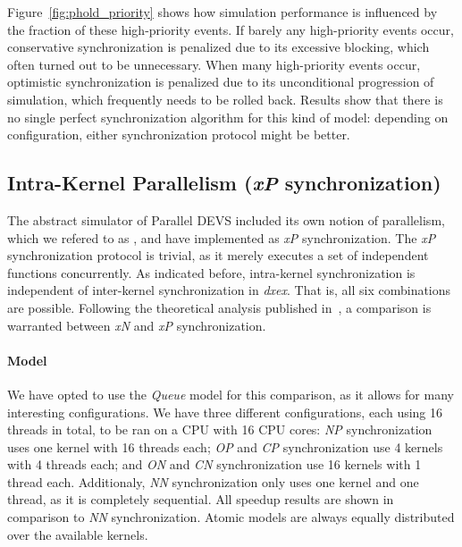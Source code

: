 Figure~\ref{fig:phold_priority} shows how simulation performance is influenced by the fraction of these high-priority events.
If barely any high-priority events occur, conservative synchronization is penalized due to its excessive blocking, which often turned out to be unnecessary.
When many high-priority events occur, optimistic synchronization is penalized due to its unconditional progression of simulation, which frequently needs to be rolled back.
Results show that there is no single perfect synchronization algorithm for this kind of model: depending on configuration, either synchronization protocol might be better.

\subsection{Intra-Kernel Parallelism (\textit{xP} synchronization)}
The abstract simulator of \textsf{Parallel DEVS} included its own notion of parallelism, which we refered to as \pSim, and have implemented as \textit{xP} synchronization.
The \textit{xP} synchronization protocol is trivial, as it merely executes a set of independent functions concurrently.
As indicated before, intra-kernel synchronization is independent of inter-kernel synchronization in \textit{dxex}.
That is, all six combinations are possible.
Following the theoretical analysis published in~\cite{amdahlpdevs}, a comparison is warranted between \textit{xN} and \textit{xP} synchronization.

\paragraph{Model}
We have opted to use the \textit{Queue} model for this comparison, as it allows for many interesting configurations.
We have three different configurations, each using 16 threads in total, to be ran on a CPU with 16 CPU cores:
\textit{NP} synchronization uses one kernel with 16 threads each;
\textit{OP} and \textit{CP} synchronization use 4 kernels with 4 threads each; and
\textit{ON} and \textit{CN} synchronization use 16 kernels with 1 thread each.
Additionaly, \textit{NN} synchronization only uses one kernel and one thread, as it is completely sequential.
All speedup results are shown in comparison to \textit{NN} synchronization.
Atomic models are always equally distributed over the available kernels.

